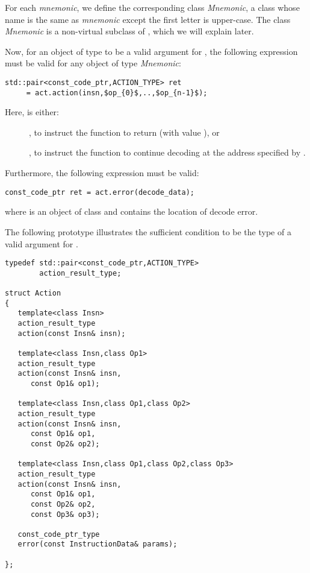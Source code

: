 \documentclass{article}
\begin{document}
For each \textit{mnemonic}, we define the corresponding class
\textit{Mnemonic}, a class whose name is the same as \textit{mnemonic}
except the first letter is upper-case. The class \textit{Mnemonic} is
a non-virtual subclass of , which we will explain
later.

Now, for an object  of type  to be a valid argument
for , the following expression must be valid for
any object  of type \textit{Mnemonic}:

\begin{lstlisting}[mathescape,frame=single]
std::pair<const_code_ptr,ACTION_TYPE> ret 
     = act.action(insn,$op_{0}$,..,$op_{n-1}$);
\end{lstlisting}
Here,  is either:
\begin{description}
\item[]   , to instruct the function to return (with value ), or
\item[] , to instruct the function to continue decoding at the address specified by
.
\end{description}



\noindent Furthermore, the following expression must be valid:
\begin{lstlisting}[frame=single]
const_code_ptr ret = act.error(decode_data);
\end{lstlisting}
\noindent where  is an object of class  and
contains the location of decode error.

The following prototype illustrates the sufficient 
condition to be the type of a valid argument for .

\begin{lstlisting}[frame=single]
typedef std::pair<const_code_ptr,ACTION_TYPE> 
        action_result_type;

struct Action
{
   template<class Insn>
   action_result_type
   action(const Insn& insn);

   template<class Insn,class Op1>
   action_result_type
   action(const Insn& insn,
	  const Op1& op1);

   template<class Insn,class Op1,class Op2>
   action_result_type
   action(const Insn& insn,
	  const Op1& op1,
	  const Op2& op2);

   template<class Insn,class Op1,class Op2,class Op3>
   action_result_type
   action(const Insn& insn,
	  const Op1& op1,
	  const Op2& op2,
	  const Op3& op3);
   
   const_code_ptr_type        
   error(const InstructionData& params);

};
\end{lstlisting}
\end{document}
